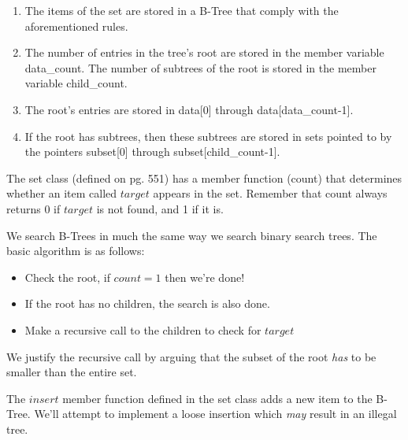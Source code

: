 \begin{enumerate}
\item The items of the set are stored in a B-Tree that comply with the aforementioned rules.
\item The number of entries in the tree's root are stored in the member variable data\_count. The number of subtrees of the root is stored in the member variable child\_count.
\item The root's entries are stored in data[0] through data[data\_count-1].
\item If the root has subtrees, then these subtrees are stored in sets pointed to by the pointers subset[0] through subset[child\_count-1].
\end{enumerate}

The set class (defined on pg. 551) has a member function (count) that determines whether an item called $target$ appears in the set. Remember that count always returns 0 if $target$ is not found, and 1 if it is.

We search B-Trees in much the same way we search binary search trees. The basic algorithm is as follows:
\begin{itemize}
\item Check the root, if $count=1$ then we're done!
\item If the root has no children, the search is also done.
\item Make a recursive call to the children to check for $target$
\end{itemize}
We justify the recursive call by arguing that the subset of the root \emph{has} to be smaller than the entire set.

The $insert$ member function defined in the set class adds a new item to the B-Tree. We'll attempt to implement a loose insertion which \emph{may} result in an illegal tree.


